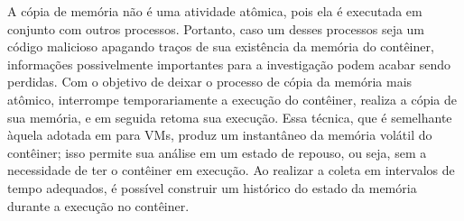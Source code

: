 A cópia de memória não é uma atividade atômica, pois ela é executada em conjunto com outros processos. 
%
Portanto, caso um desses processos seja um código malicioso apagando traços de sua existência da memória do contêiner, informações possivelmente importantes para a investigação podem acabar sendo perdidas. 
%
Com o objetivo de deixar o processo de cópia da memória mais atômico, \fancyname interrompe temporariamente a execução do contêiner, realiza a cópia de sua memória, e em seguida retoma sua execução. 
%
Essa técnica, que é semelhante àquela adotada em \cite{RafiqueStaticLiveDigitalForensics:2013} para VMs, produz um instantâneo da memória volátil do contêiner; isso permite sua análise em um estado de repouso, ou seja, sem a necessidade de ter o contêiner em execução.
%
Ao realizar a coleta em intervalos de tempo adequados, é possível construir um histórico do estado da memória durante a execução no contêiner.
%


